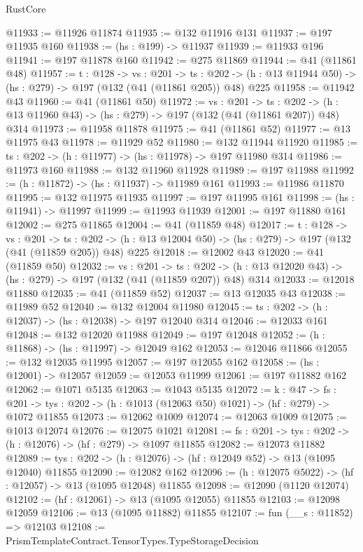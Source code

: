 \begin{lexlean}{RustCore}
\begin{coremodule}
@11933 := @11926 @11874
@11935 := @132 @11916 @131
@11937 := @197 @11935 @160
@11938 := (hs : @199) -> @11937
@11939 := @11933 @196
@11941 := @197 @11878 @160
@11942 := @275 @11869
@11944 := @41 (@11861 @48)
@11957 := {t : @128} ->
  {vs : @201} ->
  {ts : @202} -> (h : @13 @11944 @50) -> (hs : @279) -> @197 (@132 (@41 (@11861 @205)) @48) @225
@11958 := @11942 @43
@11960 := @41 (@11861 @50)
@11972 := {vs : @201} ->
  {ts : @202} -> (h : @13 @11960 @43) -> (hs : @279) -> @197 (@132 (@41 (@11861 @207)) @48) @314
@11973 := @11958 @11878
@11975 := @41 (@11861 @52)
@11977 := @13 @11975 @43
@11978 := @11929 @52
@11980 := @132 @11944 @11920
@11985 := {ts : @202} -> (h : @11977) -> (hs : @11978) -> @197 @11980 @314
@11986 := @11973 @160
@11988 := @132 @11960 @11928
@11989 := @197 @11988
@11992 := (h : @11872) -> (hs : @11937) -> @11989 @161
@11993 := @11986 @11870
@11995 := @132 @11975 @11935
@11997 := @197 @11995 @161
@11998 := (hs : @11941) -> @11997
@11999 := @11993 @11939
@12001 := @197 @11880 @161
@12002 := @275 @11865
@12004 := @41 (@11859 @48)
@12017 := {t : @128} ->
  {vs : @201} ->
  {ts : @202} -> (h : @13 @12004 @50) -> (hs : @279) -> @197 (@132 (@41 (@11859 @205)) @48) @225
@12018 := @12002 @43
@12020 := @41 (@11859 @50)
@12032 := {vs : @201} ->
  {ts : @202} -> (h : @13 @12020 @43) -> (hs : @279) -> @197 (@132 (@41 (@11859 @207)) @48) @314
@12033 := @12018 @11880
@12035 := @41 (@11859 @52)
@12037 := @13 @12035 @43
@12038 := @11989 @52
@12040 := @132 @12004 @11980
@12045 := {ts : @202} -> (h : @12037) -> (hs : @12038) -> @197 @12040 @314
@12046 := @12033 @161
@12048 := @132 @12020 @11988
@12049 := @197 @12048
@12052 := (h : @11868) -> (hs : @11997) -> @12049 @162
@12053 := @12046 @11866
@12055 := @132 @12035 @11995
@12057 := @197 @12055 @162
@12058 := (hs : @12001) -> @12057
@12059 := @12053 @11999
@12061 := @197 @11882 @162
@12062 := @1071 @5135
@12063 := @1043 @5135
@12072 := {k : @47} ->
  {fs : @201} -> {tys : @202} -> (h : @1013 (@12063 @50) @1021) -> (hf : @279) -> @1072 @11855
@12073 := @12062 @1009
@12074 := @12063 @1009
@12075 := @1013 @12074
@12076 := @12075 @1021
@12081 := {fs : @201} -> {tys : @202} -> (h : @12076) -> (hf : @279) -> @1097 @11855
@12082 := @12073 @11882
@12089 := {tys : @202} -> (h : @12076) -> (hf : @12049 @52) -> @13 (@1095 @12040) @11855
@12090 := @12082 @162
@12096 := (h : @12075 @5022) -> (hf : @12057) -> @13 (@1095 @12048) @11855
@12098 := @12090 (@1120 @12074)
@12102 := (hf : @12061) -> @13 (@1095 @12055) @11855
@12103 := @12098 @12059
@12106 := @13 (@1095 @11882) @11855
@12107 := fun (__s : @11852) => @12103
@12108 := PrismTemplateContract.TensorTypes.TypeStorageDecision

\end{coremodule}
\end{lexlean}
